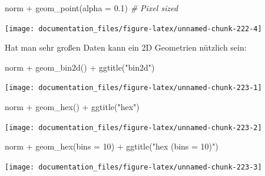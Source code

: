 \documentclass[
]{article}
\newenvironment{Shaded}{\begin{snugshade}}{\end{snugshade}}
\newcommand{\AttributeTok}[1]{\textcolor[rgb]{0.77,0.63,0.00}{#1}}
\newcommand{\CommentTok}[1]{\textcolor[rgb]{0.56,0.35,0.01}{\textit{#1}}}
\newcommand{\DecValTok}[1]{\textcolor[rgb]{0.00,0.00,0.81}{#1}}
\newcommand{\FloatTok}[1]{\textcolor[rgb]{0.00,0.00,0.81}{#1}}
\newcommand{\FunctionTok}[1]{\textcolor[rgb]{0.00,0.00,0.00}{#1}}
\newcommand{\NormalTok}[1]{#1}
\newcommand{\SpecialCharTok}[1]{\textcolor[rgb]{0.00,0.00,0.00}{#1}}
\newcommand{\StringTok}[1]{\textcolor[rgb]{0.31,0.60,0.02}{#1}}
\begin{document}
\begin{Shaded}
\begin{Highlighting}[]
\NormalTok{norm }\SpecialCharTok{+} \FunctionTok{geom\_point}\NormalTok{(}\AttributeTok{alpha =} \FloatTok{0.1}\NormalTok{) }\CommentTok{\# Pixel sized}
\end{Highlighting}
\end{Shaded}

\begin{center}\texttt{[image: documentation\_files/figure-latex/unnamed-chunk-222-4]} \end{center}

Hat man sehr großen Daten kann ein 2D Geometrien nützlich sein:

\begin{Shaded}
\begin{Highlighting}[]
\NormalTok{norm }\SpecialCharTok{+} \FunctionTok{geom\_bin2d}\NormalTok{() }\SpecialCharTok{+} \FunctionTok{ggtitle}\NormalTok{(}\StringTok{"bin2d"}\NormalTok{)}
\end{Highlighting}
\end{Shaded}

\begin{center}\texttt{[image: documentation\_files/figure-latex/unnamed-chunk-223-1]} \end{center}

\begin{Shaded}
\begin{Highlighting}[]
\NormalTok{norm }\SpecialCharTok{+} \FunctionTok{geom\_hex}\NormalTok{() }\SpecialCharTok{+} \FunctionTok{ggtitle}\NormalTok{(}\StringTok{"hex"}\NormalTok{)}
\end{Highlighting}
\end{Shaded}

\begin{center}\texttt{[image: documentation\_files/figure-latex/unnamed-chunk-223-2]} \end{center}

\begin{Shaded}
\begin{Highlighting}[]
\NormalTok{norm }\SpecialCharTok{+} \FunctionTok{geom\_hex}\NormalTok{(}\AttributeTok{bins =} \DecValTok{10}\NormalTok{) }\SpecialCharTok{+} \FunctionTok{ggtitle}\NormalTok{(}\StringTok{"hex (bins = 10)"}\NormalTok{)}
\end{Highlighting}
\end{Shaded}

\begin{center}\texttt{[image: documentation\_files/figure-latex/unnamed-chunk-223-3]} \end{center}
\end{document}
